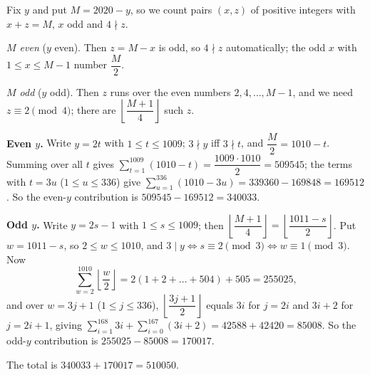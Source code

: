 Fix $y$ and put $M=2020-y$, so we count pairs $(x,z)$ of positive integers with $x+z=M$, $x$ odd and $4\nmid z$.

\emph{$M$ even} ($y$ even). Then $z=M-x$ is odd, so $4\nmid z$ automatically; the odd $x$ with $1\le x\le M-1$ number $\dfrac {M}{2}$.

\emph{$M$ odd} ($y$ odd). Then $z$ runs over the even numbers $2,4,\dots,M-1$, and we need $z\equiv2\pmod4$; there are $\left\lfloor\dfrac{M+1}{4}\right\rfloor$ such $z$.

\textbf{Even $y$.} Write $y=2t$ with $1\le t\le1009$; $3\nmid y$ iff $3\nmid t$, and $\dfrac {M}{2}=1010-t$. Summing over all $t$ gives $\sum_{t=1}^{1009}(1010-t)=\dfrac{1009\cdot1010}{2}=509545$; the terms with $t=3u$ ($1\le u\le336$) give $\sum_{u=1}^{336}(1010-3u)=339360-169848=169512$. So the even-$y$ contribution is $509545-169512=340033$.

\textbf{Odd $y$.} Write $y=2s-1$ with $1\le s\le1009$; then $\left\lfloor\dfrac{M+1}{4}\right\rfloor=\left\lfloor\dfrac{1011-s}{2}\right\rfloor$. Put $w=1011-s$, so $2\le w\le1010$, and $3\mid y\iff s\equiv2\pmod 3\iff w\equiv1\pmod3$. Now
\[
\sum_{w=2}^{1010}\left\lfloor\dfrac {w}{2}\right\rfloor=2(1+2+\dots+504)+505=255025,
\]
and over $w=3j+1$ ($1\le j\le336$), $\left\lfloor\dfrac{3j+1}{2}\right\rfloor$ equals $3i$ for $j=2i$ and $3i+2$ for $j=2i+1$, giving $\sum_{i=1}^{168}3i+\sum_{i=0}^{167}(3i+2)=42588+42420=85008$. So the odd-$y$ contribution is $255025-85008=170017$.

The total is $340033+170017=\boxed{510050}$.
